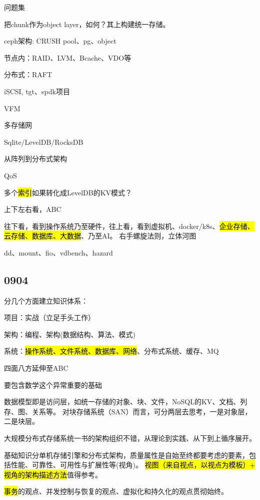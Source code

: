 问题集
\begin{enumbox}
\item 把chunk作为object layer，如何？其上构建统一存储。
\item ceph架构: CRUSH pool、pg、object
\item 节点内：RAID、LVM、Bcache、VDO等
\item 分布式：RAFT
\item iSCSI, tgt、spdk项目
\item VFM
\item 多存储网
\item Sqlite/LevelDB/RocksDB
\item 从阵列到分布式架构
\item QoS
\end{enumbox}

多个\hl{索引}如果转化成LevelDB的KV模式？

上下左右看，ABC

往下看，看到操作系统乃至硬件，往上看，看到虚拟机、docker/k8s、\hl{企业存储、云存储、数据库、大数据}、乃至AI。
右手螺旋法则，立体河图

dd、mount、fio、vdbench、hazard

\subsection{0904}

分几个方面建立知识体系：
\begin{enumbox}
\item 项目：实战（立足手头工作）
\item 架构：编程、架构(数据结构、算法、模式)
\item 系统：\hl{操作系统、文件系统、数据库、网络}、分布式系统、缓存、MQ
\item 四面八方延伸至ABC
\item 要包含数学这个异常重要的基础
\end{enumbox}

数据模型即是访问层，如统一存储的对象、块、文件，NoSQL的KV、文档、列存、图、关系等。
对块存储系统（SAN）而言，可分两层去思考，一是对象层，二是块层。

大规模分布式存储系统一书的架构组织不错，从理论到实践、从下到上循序展开。

基础知识分单机存储引擎和分布式架构，质量属性是自始至终都要考虑的要素，包括性能、可靠性、可用性与扩展性等(视角)。
\hl{视图（来自视点，以视点为模板）+ 视角的架构描述方法}值得参考。

\hl{事务}的观点、并发控制与恢复的观点、虚拟化和持久化的观点贯彻始终。

